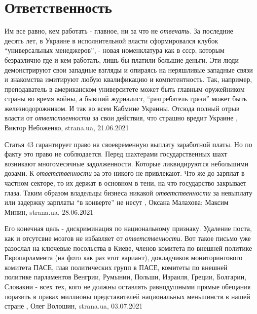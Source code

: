  
 
 
 
 
\chapter{Ответственность}
\label{sec:slova.otvetstvennost}

Им все равно, кем работать - главное, ни за что не \emph{отвечать}.  За
последние десять лет, в Украине в исполнительной власти сформировался клубок
\enquote{универсальных менеджеров}, - новая номенклатура как в ссср, которым безразлично
где и кем работать, лишь бы платили большие деньги. Эти люди демонстрируют свои
западные взгляды и опираясь на неряшливые западные связи и знакомства имитируют
любую квалификацию и компетентность. Так, например, преподаватель в
американском университете может быть главным оружейником страны во время войны,
а бывший журналист, \enquote{разгребатель грязи} может быть железнодорожником. И так во
всем Кабмине Украины.  Отсюда полный отрыв власти от \emph{ответственности} за
свои действия, что страшно вредит Украине
, 
Виктор Небоженко, strana.ua, 21.06.2021


Статья 43 гарантирует право на своевременную выплату заработной платы.  Но по
факту это право не соблюдается. Перед шахтерами государственных шахт возникают
многомесячные задолженности. Которые ликвидируются небольшими дозами. К
\emph{ответственности} за это никого не привлекают.  Что же до зарплат в частном
секторе, то их держат в основном в тени, на что государство закрывает глаза.
Таким образом владельцы бизнеса никакой \emph{ответственности} за невыплату или
задержку зарплаты \enquote{в конверте} не несут
, 
Оксана Малахова; Максим Минин, strana.ua, 28.06.2021

Его конечная цель - дискриминация по национальному признаку.  Удаление поста,
как и отсутсвие мозгов не избавляет от \emph{ответственности}. Вот такое письмо уже
разослал на ключевые посольства в Киеве, членов комитета по внешней политике
Европарламента (на фото как раз этот вариант), докладчиков мониторингового
комитета ПАСЕ, глав политических групп в ПАСЕ, комитеты по внешней политике
парламентов Венгрии, Румынии, Польши, Израиля, Греции, Болгарии, Словакии -
всех тех, кого не должны оставлять равнодушными прямые обещания поразить в
правах миллионы представителей национальных меньшинств в нашей стране
  , Олег Волошин, strana.ua, 03.07.2021
